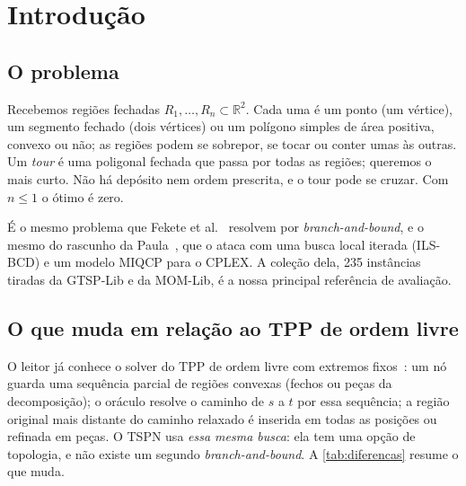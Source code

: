 \documentclass[11pt,a4paper]{article}
\theoremstyle{plain}\newtheorem{proposicao}{Proposição}
\theoremstyle{definition}\newtheorem{definicao}{Definição}
\theoremstyle{plain}\newtheorem{teorema}{Teorema}
\theoremstyle{plain}\newtheorem{lema}{Lema}
\newcommand{\R}{\mathbb R}
\begin{document}
\setcounter{tocdepth}{2}
{\small\setlength{\parskip}{0pt}\tableofcontents}
\clearpage
{}

\section{Introdução}

\subsection{O problema}
Recebemos regiões fechadas \(R_1,\dots,R_n\subset\R^2\). Cada uma é um ponto (um vértice), um segmento fechado (dois vértices) ou um polígono simples de área positiva, convexo ou não; as regiões podem se sobrepor, se tocar ou conter umas às outras. Um \emph{tour} é uma poligonal fechada que passa por todas as regiões; queremos o mais curto. Não há depósito nem ordem prescrita, e o tour pode se cruzar. Com \(n\le1\) o ótimo é zero.

É o mesmo problema que Fekete et al.~\cite{fekete} resolvem por \emph{branch-and-bound}, e o mesmo do rascunho da Paula~\cite{paula}, que o ataca com uma busca local iterada (ILS-BCD) e um modelo MIQCP para o CPLEX. A coleção dela, 235 instâncias tiradas da GTSP-Lib e da MOM-Lib, é a nossa principal referência de avaliação.

\subsection{O que muda em relação ao TPP de ordem livre}
O leitor já conhece o solver do TPP de ordem livre com extremos fixos~\cite{ordemlivre,oraculo}: um nó guarda uma sequência parcial de regiões convexas (fechos ou peças da decomposição); o oráculo resolve o caminho de \(s\) a \(t\) por essa sequência; a região original mais distante do caminho relaxado é inserida em todas as posições ou refinada em peças. O TSPN usa \emph{essa mesma busca}: ela tem uma opção de topologia, e não existe um segundo \emph{branch-and-bound}. A \cref{tab:diferencas} resume o que muda.
\end{document}
